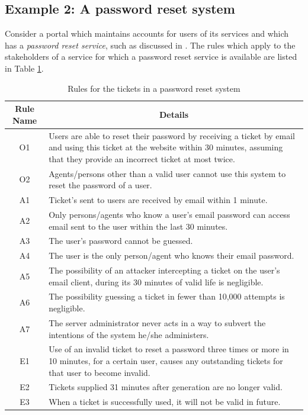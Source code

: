 \subsection{Example 2: A password reset system}\label{exm2}
Consider a portal which maintains accounts for users of its services and which has a {\em password reset service}, such as discussed in \cite{exptsandproofs}. The rules which apply to the stakeholders of a service for which a password reset service is available are listed in Table \ref{pwresetrules}.
\begin{table}[tb]
\caption{Rules for the tickets in a password reset system}\label{pwresetrules}
\begin{center}
\begin{tabular}{|c|p{9cm}|}
\hline
		\bf Rule Name&\multicolumn{1}{|c|}{\bf Details}\\
\hline
O1 & Users are able to reset their password by receiving a ticket by email and using this ticket 
at the website within 30 minutes, assuming that they provide an incorrect ticket at most twice.\\
O2 & Agents/persons other than a valid user cannot use this system to reset the password of a user.\\
A1 & Ticket's sent to users are received by email within 1 minute.\\
A2 & Only persons/agents who know a user's email password can access email sent to the user within
the last 30 minutes.\\
A3 & The user's password cannot be guessed.\\
A4 & The user is the only person/agent who knows their email password.\\
A5 & The possibility of an attacker intercepting a ticket on
the user's email client, during its 30 minutes of valid life is negligible.\\
A6 & The possibility guessing a ticket in fewer than 10,000 attempts is negligible.\\
A7 & The server administrator never acts in a way to subvert the intentions of the system he/she administers.\\
E1 & Use of an invalid ticket to reset a password three times or more in 10 minutes, for
a certain user, causes any outstanding tickets for that user to become invalid.\\
E2 & Tickets supplied 31 minutes after generation are no longer valid.\\
E3 & When a ticket is successfully used, it will not be valid in future.\\

\end{tabular}
\end{center}
\end{table}
